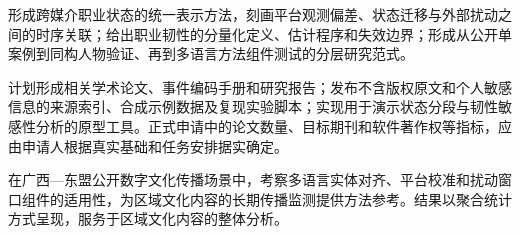 \GXNSFBodyText


形成跨媒介职业状态的统一表示方法，刻画平台观测偏差、状态迁移与外部扰动之间的时序关联；给出职业韧性的分量化定义、估计程序和失效边界；形成从公开单案例到同构人物验证、再到多语言方法组件测试的分层研究范式。


计划形成相关学术论文、事件编码手册和研究报告；发布不含版权原文和个人敏感信息的来源索引、合成示例数据及复现实验脚本；实现用于演示状态分段与韧性敏感性分析的原型工具。正式申请中的论文数量、目标期刊和软件著作权等指标，应由申请人根据真实基础和任务安排据实确定。


在广西—东盟公开数字文化传播场景中，考察多语言实体对齐、平台校准和扰动窗口组件的适用性，为区域文化内容的长期传播监测提供方法参考。结果以聚合统计方式呈现，服务于区域文化内容的整体分析。
